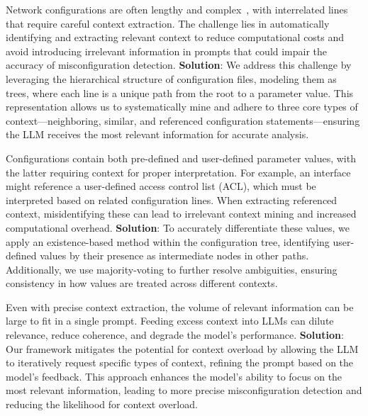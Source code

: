  Network
configurations are often lengthy and
complex~\cite{benson2009complexitymetrics}, with interrelated lines that
require careful context extraction. The challenge lies in automatically
identifying and extracting relevant context to reduce computational costs and
avoid introducing irrelevant information in prompts that could impair the accuracy of
misconfiguration detection. \textbf{Solution}: We address this challenge by
leveraging the hierarchical structure of configuration files, modeling them as
trees, where each line is a unique path from the root to a parameter value.
This representation allows us to systematically mine and adhere to three core types of
context---neighboring, similar, and referenced configuration
statements---ensuring the LLM receives the most relevant information for
accurate analysis.

Configurations contain both pre-defined and user-defined parameter values,
with the latter requiring context for proper interpretation. For example, an
interface might reference a user-defined access control list (ACL), which must
be interpreted based on related configuration lines. When extracting
referenced context, misidentifying these can lead to irrelevant context mining
and increased computational overhead. \textbf{Solution}: To accurately
differentiate these values, we apply an existence-based method within the
configuration tree, identifying user-defined values by their presence as
intermediate nodes in other paths. Additionally, we use majority-voting to
further resolve ambiguities, ensuring consistency in how values are treated across
different contexts.

Even with precise context extraction, the volume of relevant information can
be large to fit in a single prompt. 
Feeding excess context into LLMs can dilute relevance, reduce coherence, and degrade the model’s performance.
\textbf{Solution}: Our framework mitigates the potential for context overload
by allowing the LLM to iteratively request specific types of context, refining
the prompt based on the model’s feedback. This approach enhances the model’s
ability to focus on the most relevant information, leading to more precise
misconfiguration detection and reducing the likelihood for context overload.

